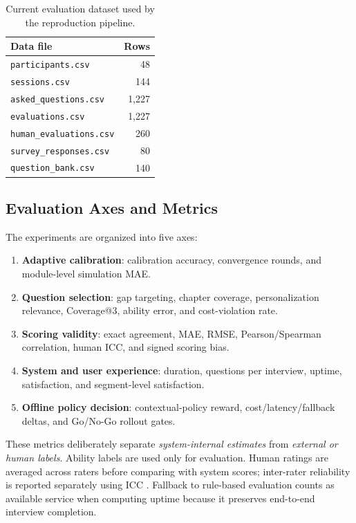 ﻿\documentclass[final,3p,times,authoryear]{elsarticle}
\begin{document}
\begin{table}[H]
\centering
\caption{Current evaluation dataset used by the reproduction pipeline.}
\label{tab:dataset_summary}
\begin{tabular}{lr}
\toprule
\textbf{Data file} & \textbf{Rows} \\
\midrule
\texttt{participants.csv} & 48 \\
\texttt{sessions.csv} & 144 \\
\texttt{asked\_questions.csv} & 1,227 \\
\texttt{evaluations.csv} & 1,227 \\
\texttt{human\_evaluations.csv} & 260 \\
\texttt{survey\_responses.csv} & 80 \\
\texttt{question\_bank.csv} & 140 \\
\bottomrule
\end{tabular}
\end{table}

\subsection{Evaluation Axes and Metrics}

\noindent The experiments are organized into five axes:
\begin{enumerate}
    \item \textbf{Adaptive calibration}: calibration accuracy, convergence rounds, and module-level simulation MAE.
    \item \textbf{Question selection}: gap targeting, chapter coverage, personalization relevance, Coverage@3, ability error, and cost-violation rate.
    \item \textbf{Scoring validity}: exact agreement, MAE, RMSE, Pearson/Spearman correlation, human ICC, and signed scoring bias.
    \item \textbf{System and user experience}: duration, questions per interview, uptime, satisfaction, and segment-level satisfaction.
    \item \textbf{Offline policy decision}: contextual-policy reward, cost/latency/fallback deltas, and Go/No-Go rollout gates.
\end{enumerate}

\noindent These metrics deliberately separate \emph{system-internal estimates} from \emph{external or human labels}. Ability labels are used only for evaluation. Human ratings are averaged across raters before comparing with system scores; inter-rater reliability is reported separately using ICC \cite{shrout1979icc}. Fallback to rule-based evaluation counts as available service when computing uptime because it preserves end-to-end interview completion.
\end{document}

